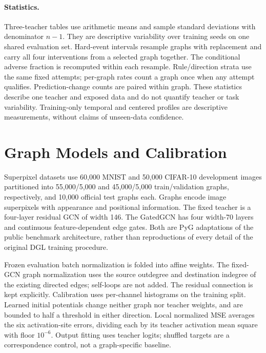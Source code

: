 \documentclass[10pt,twocolumn,letterpaper]{article}
\begin{document}
\paragraph{Statistics.} Three-teacher tables use arithmetic means and sample standard deviations with denominator $n-1$. They are descriptive variability over training seeds on one shared evaluation set. Hard-event intervals resample graphs with replacement and carry all four interventions from a selected graph together. The conditional adverse fraction is recomputed within each resample. Rule/direction strata use the same fixed attempts; per-graph rates count a graph once when any attempt qualifies. Prediction-change counts are paired within graph. These statistics describe one teacher and exposed data and do not quantify teacher or task variability. Training-only temporal and centered profiles are descriptive measurements, without claims of unseen-data confidence.

\section{Graph Models and Calibration}
Superpixel datasets use 60,000 MNIST and 50,000 CIFAR-10 development images partitioned into 55,000/5,000 and 45,000/5,000 train/validation graphs, respectively, and 10,000 official test graphs each. Graphs encode image superpixels with appearance and positional information. The fixed teacher is a four-layer residual GCN of width 146. The GatedGCN has four width-70 layers and continuous feature-dependent edge gates. Both are PyG adaptations of the public benchmark architecture, rather than reproductions of every detail of the original DGL training procedure.

Frozen evaluation batch normalization is folded into affine weights. The fixed-GCN graph normalization uses the source outdegree and destination indegree of the existing directed edges; self-loops are not added. The residual connection is kept explicitly. Calibration uses per-channel histograms on the training split. Learned initial potentials change neither graph nor teacher weights, and are bounded to half a threshold in either direction. Local normalized MSE averages the six activation-site errors, dividing each by its teacher activation mean square with floor $10^{-6}$. Output fitting uses teacher logits; shuffled targets are a correspondence control, not a graph-specific baseline.
\end{document}
